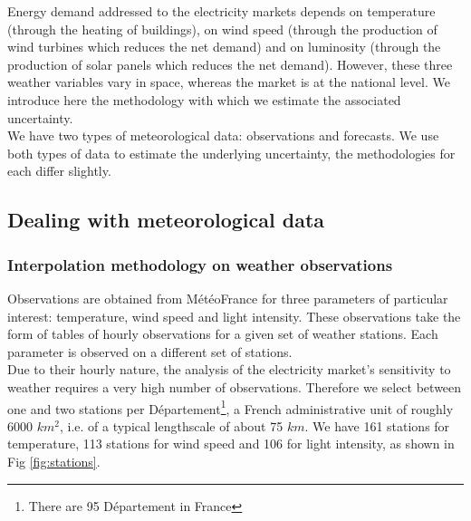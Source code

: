 Energy  demand  addressed to the electricity markets depends on  temperature (through the heating of buildings), on wind speed (through the production of wind turbines which reduces the net demand) and on luminosity (through the production of solar panels which reduces the net demand). However, these three weather variables vary in space, whereas the market is at the national level. We introduce here the methodology with which we estimate the associated uncertainty.\\  

We have two types of meteorological data: observations and forecasts. We use both types of data to estimate the underlying uncertainty, the methodologies for each differ slightly. \\
\subsection{Dealing with meteorological data}
\subsubsection{Interpolation methodology on weather observations}
\label{interpmethodo}

Observations are obtained from M\'{e}t\'{e}oFrance for three parameters of particular interest: temperature, wind speed and light intensity. These observations take the form of tables of hourly observations for a given set of weather stations. Each parameter is observed on a different set of stations.\\ 

Due to their hourly nature, the analysis of the electricity market's sensitivity to weather requires a very high number of observations. Therefore we select between one and two stations per D\'{e}partement\footnote{There are 95 D\'{e}partement in France}, a French administrative unit of roughly 6000 $km^2$, i.e. of a typical lengthscale of about 75 $km$. We have 161 stations for temperature, 113 stations for wind speed and 106 for light intensity, as shown in Fig \ref{fig:stations}. \\


